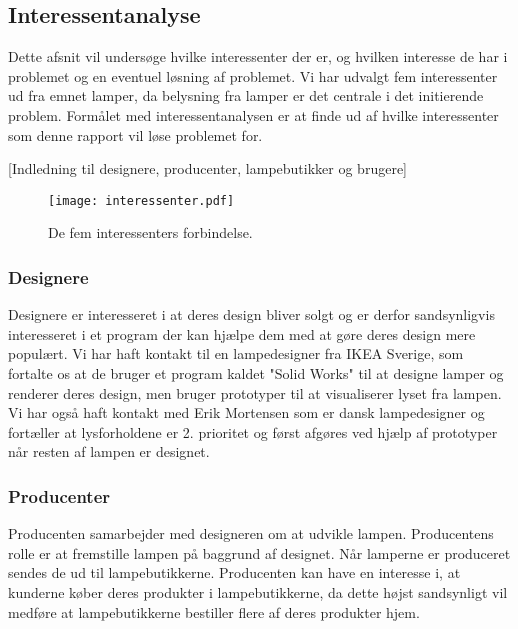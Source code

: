 \subsection{Interessentanalyse}
Dette afsnit vil undersøge hvilke interessenter der er, og hvilken interesse de har i problemet og en eventuel løsning af problemet. Vi har udvalgt fem interessenter ud fra emnet lamper, da belysning fra lamper er det centrale i det initierende problem. Formålet med interessentanalysen er at finde ud af hvilke interessenter som denne rapport vil løse problemet for.

[Indledning til designere, producenter, lampebutikker og brugere]
\begin{figure}[H]
	\texttt{[image: interessenter.pdf]}
	\caption{De fem interessenters forbindelse.}
    \label{fig:interessenter}
\end{figure}

\subsubsection{Designere}
Designere er interesseret i at deres design bliver solgt og er derfor sandsynligvis interesseret i et program der kan hjælpe dem med at gøre deres design mere populært.
Vi har haft kontakt til en lampedesigner fra IKEA Sverige, som fortalte os at de bruger et program kaldet "Solid Works"\cite{SolidWorks} til at designe lamper og renderer deres design, men bruger prototyper til at visualiserer lyset fra lampen\cite{sec:mailDavid}.
Vi har også haft kontakt med Erik Mortensen som er dansk lampedesigner og fortæller at lysforholdene er 2. prioritet og først afgøres ved hjælp af prototyper når resten af lampen er designet\cite{sec:mailErik}.

\subsubsection{Producenter}
Producenten samarbejder med designeren om at udvikle lampen. Producentens rolle er at fremstille lampen på baggrund af designet. Når lamperne er produceret sendes de ud til lampebutikkerne. Producenten kan have en interesse i, at kunderne køber deres produkter i lampebutikkerne, da dette højst sandsynligt vil medføre at lampebutikkerne bestiller flere af deres produkter hjem. 

